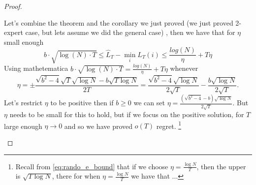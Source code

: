 \documentclass[11pt]{article}
\theoremstyle{quest}
\begin{document}
\begin{proof}
\begin{tcolorbox}
 Let's combine the theorem and the corollary we just proved (we just proved 2-expert case, but lets assume we did the general case) , then we have that for $\eta$ small enough
 $$ b\cdot \sqrt{\log(N) \cdot T} \le\hat{L}_T-\min_{i}L_T(i) \le \frac{log(N)}{\eta}+T\eta$$
 Using mathetematica $b\cdot \sqrt{\log(N) \cdot T} = \frac{log(N)}{\eta}+T\eta$ whenever $$\eta= \pm \frac{\sqrt{b^2-4}\sqrt{T}\sqrt{\log{N}}-b\sqrt{T\log{N}}}{2T} =\frac{\sqrt{b^2-4}\sqrt{\log{N}}}{2\sqrt{T}}-\frac{b\sqrt{\log{N}}}{2\sqrt{T}}.$$ Let's restrict $\eta$ to be positive then if $b\ge0$ we can set $\eta = \frac{(\sqrt{b^2-4}-b)\sqrt{\log{N}}}{2\sqrt{T}}$. But $\eta$ needs to be small for this to hold, but if we focus on the positive solution, for $T$ large enough $\eta \rightarrow 0$ and so we have proved $o(T)$ regret. \footnote{ Recall from  {\color{blue} \ref{eq:rando_e_bound}} that  if we choose $\eta = \frac{\log{N}}{T}$, then the upper is $\sqrt{T\log{N}}$, there for when $\eta = \frac{\log{N}}{T}$ we have that $\dots$} 
 \end{tcolorbox}

\end{proof}
\end{document}
